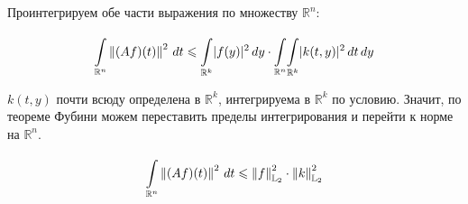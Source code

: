 	Проинтегрируем обе части выражения по множеству $\mathbb{R}^n$:
	
	$$ \underset{\mathbb{R}^n}{\overset{}{\int}} \left\| (Af)(t) \right\|^2 \, dt \leqslant \underset{\mathbb{R}^k}{\int} |f(y)|^2 \, dy 
	   \cdot \underset{\mathbb{R}^n}{\overset{}{\int}} \underset{\mathbb{R}^k}{\overset{}{\int}} |k(t,y)|^2 \, dt \, dy $$
	
	$k(t,y)$ почти всюду определена в $\mathbb{R}^k$, интегрируема
	в $\mathbb{R}^k$ по условию. Значит, по теореме Фубини можем переставить пределы интегрирования 
	и перейти к норме на $\mathbb{R}^n$.
	
	$$ \underset{\mathbb{R}^n}{\overset{}{\int}} \left\| (Af)(t) \right\|^2 \, dt \leqslant \left\| f \right\|^2_{\mathbb{L}_2} \cdot \left\| k \right\|^2_{\mathbb{L}_2} $$
